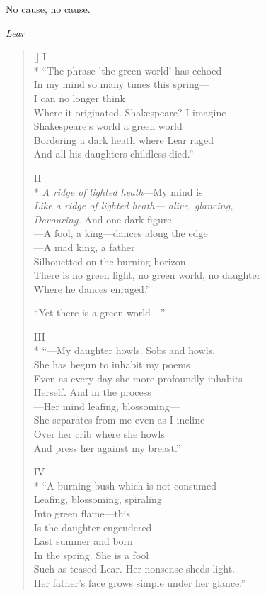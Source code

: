 \label{ch:amotherwatching}
\begingroup
\setlength{\epigraphwidth}{2.25cm}
\epigraph{No cause, no cause.}{\textit{Lear}}
\endgroup
\settowidth{\versewidth}{There is no green light, no green world, no daughter}
\begin{verse}[\versewidth]
I\\*
 ``The phrase 'the green world' has echoed\\
In my mind so many times this spring---\\
I can no longer think\\
Where it originated.  Shakespeare?   I imagine \\
Shakespeare's world a green world\\
Bordering a dark heath where Lear raged\\
And all his daughters childless died.''

II\\*
\textit{A ridge of lighted heath}---My mind is \\
\textit{Like a ridge of lighted heath--- alive, glancing,\\
Devouring.} And one dark figure\\
---A fool, a king---dances along the edge\\
---A mad king, a father\\
Silhouetted on the burning horizon.\\
There is no green light, no green world, no daughter\\
Where he dances enraged.''

``Yet there is a green world---''

III\\*
``---My daughter howls. Sobs and howls.\\
She has begun to inhabit my poems\\
Even as every day she more profoundly inhabits\\
Herself. And in the process\\
---Her mind leafing, blossoming---\\
She separates from me even as I incline\\
Over her crib where she howls\\
And press her against my breast.''

IV\\*
``A burning bush which is not consumed---\\
Leafing, blossoming, spiraling\\
Into green flame---this\\
Is the daughter engendered\\
Last summer and born\\
In the spring. She is a fool\\
Such as teased Lear. Her nonsense sheds light.\\
Her father's face grows simple under her glance.''


\end{verse}
